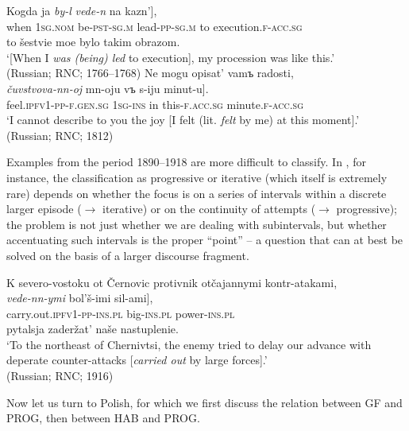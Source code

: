 \documentclass[output=paper]{langscibook}
\begin{document}
\ea\label{wiem:ex:led}{\gll
\minsp{[} {Kogda} {ja} {\textit{by-l}} {\textit{vede-n}} {na} {kazn’}],\\
{} when \textsc{1sg.nom} be-\textsc{pst-sg.m} lead-\textsc{pp-sg.m} to execution.\textsc{f-acc.sg}\\
{to šestvie moe bylo takim obrazom.}\\
\glt ‘[When I \textit{was (being) led} to execution], my procession was like this.’\\
\hfill (Russian; RNC; 1766--1768)
}
\ex\label{wiem:ex:felt}{{Ne mogu opisat’ vamъ radosti,}\\ 
\gll \minsp{[} {\textit{čuvstvova-nn-oj}} {mn-oju} {vъ} {s-iju} {minut-u}].\\
{} feel.\textsc{ipfv1-pp-f.gen.sg} \textsc{1sg-ins} in this-\textsc{f.acc.sg} minute.\textsc{f-acc.sg}\\
\glt ‘I cannot describe to you the joy [I felt (lit. {\textit{felt}} by me) at this moment].’  \\
\hfill (Russian; RNC; 1812)
}
\z

\noindent Examples from the period 1890--1918 are more difficult to classify. In , for instance, the classification as progressive or iterative (which itself is extremely rare) depends on whether the focus is on a series of intervals within a discrete larger episode ($\rightarrow$ iterative) or on the continuity of attempts ($\rightarrow$ progressive); the problem is not just whether we are dealing with subintervals, but whether accentuating such intervals is the proper “point” -- a question that can at best be solved on the basis of a larger discourse fragment.

\ea\label{wiem:ex:led-large}{{K severo-vostoku ot Černovic protivnik otčajannymi kontr-atakami,}\\
\gll \minsp{[} {\textit{vede-nn-ymi}} {bol’š-imi} {sil-ami}], \\
{} carry.out.\textsc{ipfv1-pp-ins.pl} big-\textsc{ins.pl} power-\textsc{ins.pl}\\
{pytalsja zaderžat’ naše nastuplenie.}\\
\glt ‘To the northeast of Chernivtsi, the enemy tried to delay our advance with deperate counter-attacks [\textit{carried out} by large forces].’ \\
\hfill (Russian; RNC; 1916)
}
\z

\noindent Now let us turn to Polish, for which we first discuss the relation between GF and PROG, then between HAB and PROG. 
\end{document}
